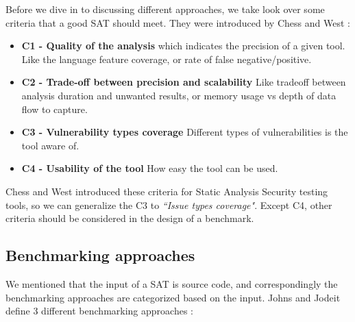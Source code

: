 \documentclass[authoryear,preprint]{sigplanconf}
\begin{document}
Before we dive in to discussing different approaches, we take look over some criteria that a good SAT should meet. They were introduced by Chess and West \cite{Chess:2007:SPS:1406221}:

\begin{itemize}
	\item \textbf{C1 - Quality of the analysis} which indicates the precision of a given tool. Like the language feature coverage, or rate of false negative/positive.
	\item \textbf{C2 - Trade-off between precision and scalability} Like tradeoff between analysis duration and unwanted results, or memory usage vs depth of data flow to capture. 
	\item \textbf{C3 - Vulnerability types coverage} Different types of vulnerabilities is the tool aware of. 
	\item \textbf{C4 - Usability of the tool} How easy the tool can be used.
\end{itemize}

Chess and West introduced these criteria for Static Analysis Security testing tools, so we can generalize the C3 to \textit{``Issue types coverage"}. Except C4, other criteria should be considered in the design of a benchmark. 

\subsection{Benchmarking approaches}
We mentioned that the input of a SAT is source code, and correspondingly the benchmarking approaches are categorized based on the input. Johns and Jodeit define 3 different benchmarking approaches \cite{Scanstud}: 
\end{document}
